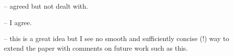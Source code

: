 
-- agreed but not dealt with.



-- I agree.


-- this is a great idea but I see no smooth and sufficiently
concise (!) way to extend the paper with comments on future work
such as this.





